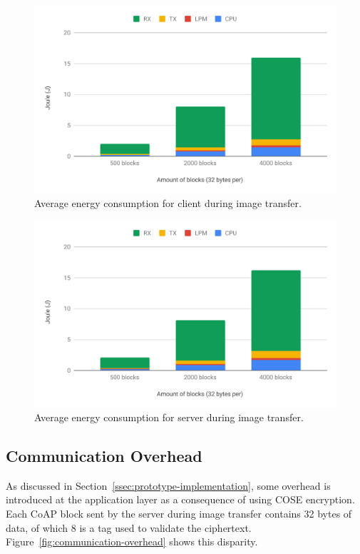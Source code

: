 \documentclass[0-thesis.tex]{subfiles}
\begin{document}
\begin{figure}[]
    \caption{Average energy consumption for client during image transfer.}
    \label{fig:client-image-energy}
    \includegraphics[scale=0.65]{images/client-image-energy.pdf}
\end{figure}

\begin{figure}[]
    \caption{Average energy consumption for server during image transfer.}
    \label{fig:server-image-energy}
    \includegraphics[scale=0.65]{images/server-image-energy.pdf}
\end{figure}

\newpage    %
\subsection{Communication Overhead}
\label{ssec:communication-overhead}
As discussed in Section~\ref{ssec:prototype-implementation}, some overhead is introduced
at the application layer as a consequence of using COSE encryption. Each CoAP block sent by
the server during image transfer contains 32 bytes of data, of which 8 is a tag used to
validate the ciphertext. Figure~\ref{fig:communication-overhead} shows this disparity.
\end{document}
